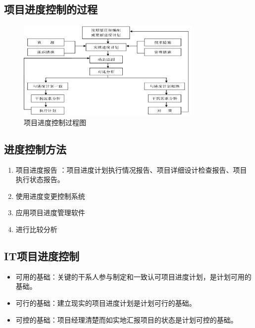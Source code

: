 \subsection{项目进度控制的过程}
\begin{figure}[!h]
	\centering
	\includegraphics[width=0.8\textwidth]{image/5-7}
	\caption{项目进度控制过程图}
\end{figure}
\subsection{进度控制方法}
\begin{enumerate}
	\item 项目进度报告 ：项目进度计划执行情况报告、项目详细设计检查报告、项目执行状态报告。
	\item 使用进度变更控制系统
	\item 应用项目进度管理软件 
	\item 进行比较分析 
\end{enumerate}
\subsection{IT项目进度控制}
\begin{itemize}
	\item 可用的基础：关键的干系人参与制定和一致认可项目进度计划，是计划可用的基础。
	\item 可行的基础：建立现实的项目进度计划是计划可行的基础。
	\item 可控的基础：项目经理清楚而如实地汇报项目的状态是计划可控的基础。
\end{itemize}

